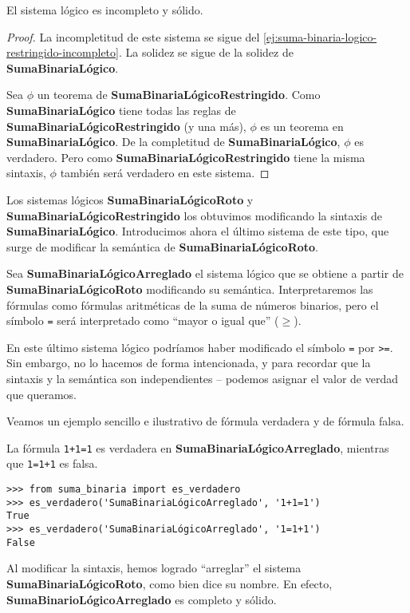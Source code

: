 \begin{proposicion}
El sistema lógico  es incompleto y sólido.
\end{proposicion}
\begin{proof}
La incompletitud de este sistema se sigue del \cref{ej:suma-binaria-logico-restringido-incompleto}. La solidez se sigue de la solidez de \textbf{SumaBinariaLógico}.

Sea $\phi$ un teorema de \textbf{SumaBinariaLógicoRestringido}. Como \textbf{SumaBinariaLógico} tiene todas las reglas de \textbf{SumaBinariaLógicoRestringido} (y una más), $\phi$ es un teorema en \textbf{SumaBinariaLógico}. De la completitud de \textbf{SumaBinariaLógico}, $\phi$ es verdadero. Pero como \textbf{SumaBinariaLógicoRestringido} tiene la misma sintaxis, $\phi$ también será verdadero en este sistema.
\end{proof}

Los sistemas lógicos \textbf{SumaBinariaLógicoRoto} y \textbf{SumaBinariaLógicoRestringido} los obtuvimos modificando la sintaxis de \textbf{SumaBinariaLógico}. Introducimos ahora el último sistema de este tipo, que surge de modificar la semántica de \textbf{SumaBinariaLógicoRoto}.

\begin{sistemalogico}\label{sl:suma-binaria-logico-arreglado}
Sea \textbf{SumaBinariaLógicoArreglado} el sistema lógico que se obtiene a partir de \textbf{SumaBinariaLógicoRoto} modificando su semántica. Interpretaremos las fórmulas como fórmulas aritméticas de la suma de números binarios, pero el símbolo \texttt{=} será interpretado como ``mayor o igual que'' ($\geq$).
\end{sistemalogico}

En este último sistema lógico podríamos haber modificado el símbolo \texttt{=} por \texttt{>=}. Sin embargo, no lo hacemos de forma intencionada, y para recordar que la sintaxis y la semántica son independientes -- podemos asignar el valor de verdad que queramos.

Veamos un ejemplo sencillo e ilustrativo de fórmula verdadera y de fórmula falsa.

\begin{ejemplo}\label{ej:suma-binaria-logico-arreglado}
La fórmula \texttt{1+1=1} es verdadera en \textbf{SumaBinariaLógicoArreglado}, mientras que \texttt{1=1+1} es falsa.
\begin{lstlisting}[numbers=none,frame=none]
>>> from suma_binaria import es_verdadero
>>> es_verdadero('SumaBinariaLógicoArreglado', '1+1=1')
True
>>> es_verdadero('SumaBinariaLógicoArreglado', '1=1+1')
False
\end{lstlisting}
\end{ejemplo}
Al modificar la sintaxis, hemos logrado ``arreglar'' el sistema \textbf{SumaBinariaLógicoRoto}, como bien dice su nombre. En efecto, \textbf{SumaBinarioLógicoArreglado} es completo y sólido.

